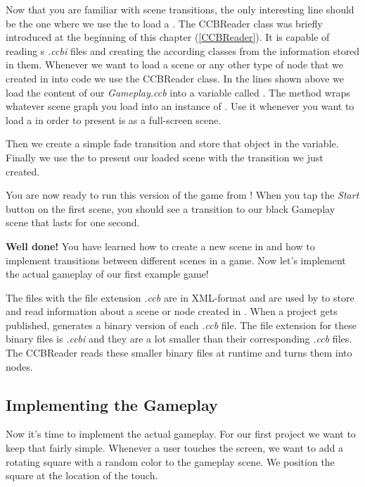 Now that you are familiar with scene transitions, the only interesting line
should be the one where we use the  to
load a \ccbfile{}. The CCBReader class was briefly introduced at the beginning
of this chapter (\ref{CCBReader}). It is capable of reading \SB{}s
\textit{.ccbi} files and creating the according \cocos{} classes from the
information stored in them. Whenever we want to load a scene or any
other type of node that we created in \SB{} into code we use the CCBReader
class. In the lines shown above we load the content of our
\textit{Gameplay.ccb} into a variable called . The
 method wraps whatever scene graph you load into an
instance of . Use it whenever you want to load a \ccbfile{}
in order to present is as a full-screen scene.

Then we create a simple fade transition and store that object in
the  variable. Finally we use the  to present our loaded scene with the transition we just created.

You are now ready to run this version of the game from \xcode{}! When you tap
the \textit{Start} button on the first scene, you should see a transition to our
black Gameplay scene that lasts for one second.

\textbf{Well done!} You have learned how to create a new scene in \SB{} and how
to implement transitions between different scenes in a game. Now let's implement
the actual gameplay of our first example game!

\begin{details} 
The files with the file extension \textit{.ccb} are in XML-format and are used
by \SB{} to store and read information about a scene or node created in \SB{}.
When a \SB{} project gets published, \SB{} generates a binary version of
each \textit{.ccb} file. The file extension for these binary files is
\textit{.ccbi} and they are a lot smaller than their corresponding
\textit{.ccb} files. The CCBReader reads these smaller binary files at runtime
and turns them into nodes.
\end{details}

\subsection{Implementing the Gameplay}
Now it's time to implement the actual gameplay. For our first project we want to
keep that fairly simple. Whenever a user touches the screen, we want to add a
rotating square with a random color to the gameplay scene. We position the
square at the location of the touch. 


